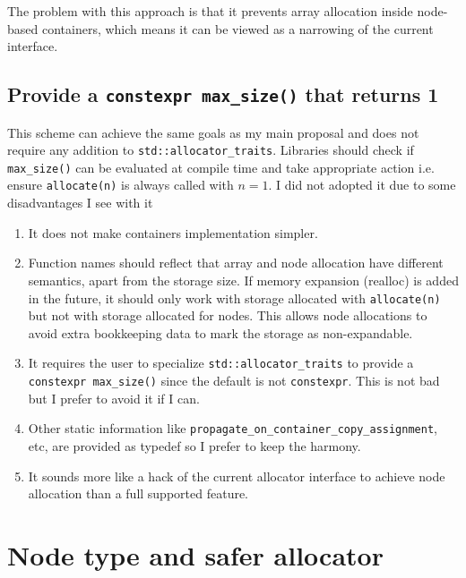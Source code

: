 \documentclass[11pt]{article}
\begin{document}
The problem with this approach is that it prevents array allocation inside
node-based containers, which means it can be viewed as a narrowing of the
current interface.

\subsection{Provide a \texttt{constexpr max\_size()} that returns 1}


This scheme
can achieve the same goals as my main proposal and does not require any
addition to \texttt{std::allocator\_traits}. Libraries should check if
\texttt{max\_size()} can be evaluated at compile time and take appropriate
action i.e. ensure \texttt{allocate(n)} is always called with $n = 1$.
I did not adopted it due to some disadvantages I see with it

\begin{enumerate}
\item It does not make containers implementation simpler.

\item Function names should reflect that array and node allocation have
different semantics, apart from the storage size. If memory expansion (realloc)
is added in the future, it should only work with storage allocated with
\texttt{allocate(n)} but not with storage allocated for nodes. This allows node
allocations to avoid extra bookkeeping data to mark the storage as
non-expandable.

\item It requires the user to specialize \texttt{std::allocator\_traits} to
provide a \texttt{constexpr max\_size()} since the default is not
\texttt{constexpr}. This is not bad but I prefer to avoid it if I can.

\item Other static information like \texttt{propagate\_on\_container\_copy\_assignment}, etc,
are provided as typedef so I prefer to keep the harmony.

\item It sounds more like a hack of the current allocator interface to achieve
node allocation than a full supported feature.

\end{enumerate}

\newpage

\section{Node type and safer allocator} \label{saferalloc}
\end{document}
